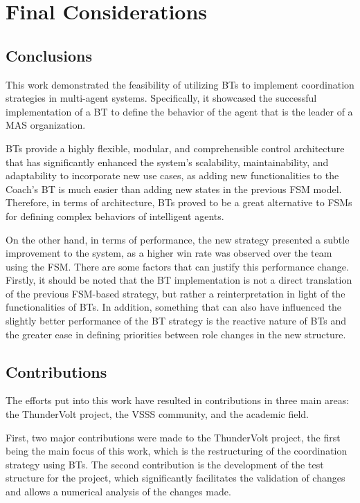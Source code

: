 \chapter{Final Considerations}
\label{ch:final_considerations}

\section{Conclusions}

This work demonstrated the feasibility of utilizing BTs to implement coordination strategies in multi-agent systems. Specifically, it showcased the successful implementation of a BT to define the behavior of the agent that is the leader of a MAS organization.

BTs provide a highly flexible, modular, and comprehensible control architecture that has significantly enhanced the system's scalability, maintainability, and adaptability to incorporate new use cases, as adding new functionalities to the Coach's BT is much easier than adding new states in the previous FSM model. Therefore, in terms of architecture, BTs proved to be a great alternative to FSMs for defining complex behaviors of intelligent agents.

On the other hand, in terms of performance, the new strategy presented a subtle improvement to the system, as a higher win rate was observed over the team using the FSM. There are some factors that can justify this performance change. Firstly, it should be noted that the BT implementation is not a direct translation of the previous FSM-based strategy, but rather a reinterpretation in light of the functionalities of BTs. In addition, something that can also have influenced the slightly better performance of the BT strategy is the reactive nature of BTs and the greater ease in defining priorities between role changes in the new structure.

\section{Contributions}

The efforts put into this work have resulted in contributions in three main areas: the ThunderVolt project, the VSSS community, and the academic field.

First, two major contributions were made to the ThunderVolt project, the first being the main focus of this work, which is the restructuring of the coordination strategy using BTs. The second contribution is the development of the test structure for the project, which significantly facilitates the validation of changes and allows a numerical analysis of the changes made.

